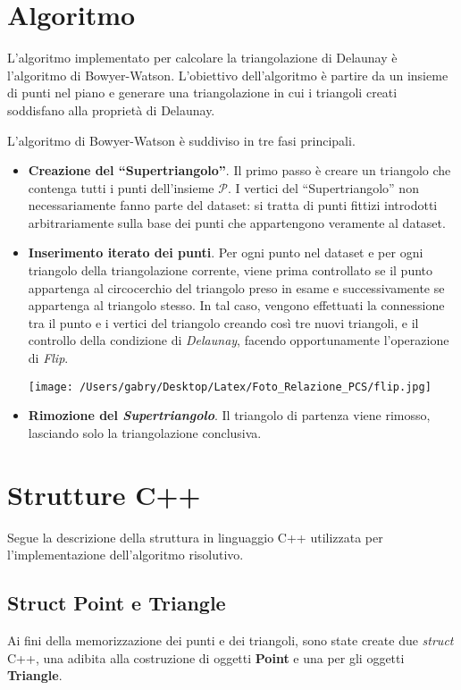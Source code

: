 \documentclass{article}
\begin{document}
\section{Algoritmo}
L'algoritmo implementato per calcolare la triangolazione di Delaunay è l'algoritmo di Bowyer-Watson.
L'obiettivo dell'algoritmo è partire da un insieme di punti nel piano e generare una triangolazione in cui i triangoli creati soddisfano alla proprietà di Delaunay.  

\noindent L'algoritmo di Bowyer-Watson è suddiviso in tre fasi principali.
\begin{itemize}
\item \textbf{Creazione del \enquote{Supertriangolo}}.  Il primo passo è creare un triangolo che contenga tutti i punti dell'insieme $\mathcal{P}$.  I vertici del \enquote{Supertriangolo} non necessariamente fanno parte del dataset: si tratta di punti fittizi introdotti arbitrariamente sulla base dei punti che appartengono veramente al dataset.  

\item \textbf{Inserimento iterato dei punti}.  Per ogni punto nel dataset e per ogni triangolo della triangolazione corrente,  viene prima controllato se il punto appartenga al circocerchio del triangolo preso in esame e successivamente se appartenga al triangolo stesso.  In tal caso,  vengono effettuati la connessione tra il punto e i vertici del triangolo creando così tre nuovi triangoli,  e il controllo della condizione di \emph{Delaunay},  facendo opportunamente l'operazione di \emph{Flip}.

\begin{center}
\texttt{[image: /Users/gabry/Desktop/Latex/Foto\_Relazione\_PCS/flip.jpg]}
\end{center}

\item \textbf{Rimozione del \emph{Supertriangolo}}.  Il triangolo di partenza viene rimosso,  lasciando solo la triangolazione conclusiva.

\end{itemize}

    
\newpage
\section{Strutture C++}
Segue la descrizione della struttura in linguaggio C++ utilizzata per l'implementazione dell'algoritmo risolutivo.

\subsection{Struct Point e Triangle}
Ai fini della memorizzazione dei punti e dei triangoli,  sono state create due \emph{struct} C++,  una adibita alla costruzione di oggetti \textbf{Point} e una per gli oggetti \textbf{Triangle}.  \\
\end{document}
